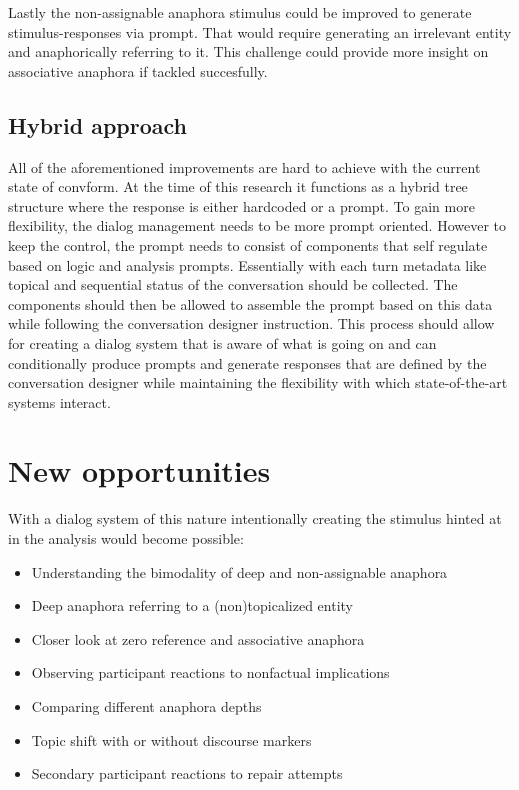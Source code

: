 \documentclass[12pt]{report}
\begin{document}
{        Lastly the non-assignable anaphora stimulus could be improved to generate stimulus-responses via prompt.
        That would require generating an irrelevant entity and anaphorically referring to it.
        This challenge could provide more insight on associative anaphora if tackled succesfully.

    \subsection{Hybrid approach}

            All of the aforementioned improvements are hard to achieve with the current state of convform.
            At the time of this research it functions as a hybrid tree structure where the response is either
            hardcoded or a prompt.
            To gain more flexibility, the dialog management needs to be more prompt oriented.
            However to keep the control, the prompt needs to consist of components that self regulate based on
            logic and analysis prompts.
            Essentially with each turn metadata
            like topical and sequential status of the conversation should be collected.
            The components should then be allowed to assemble the prompt
            based on this data while following the conversation designer instruction.
            This process should allow for creating a dialog system that is aware of what is going on
            and can conditionally produce prompts and generate responses
            that are defined by the conversation designer
            while maintaining the flexibility with which state-of-the-art systems interact.

\section{New opportunities}

With a dialog system of this nature
intentionally creating the stimulus hinted at in the analysis would become possible:

    \begin{itemize}
    \item{Understanding the bimodality of deep and non-assignable anaphora}
    \item{Deep anaphora referring to a (non)topicalized entity}
    \item{Closer look at zero reference and associative anaphora}
    \item{Observing participant reactions to nonfactual implications}
    \item{Comparing different anaphora depths}
    \item{Topic shift with or without discourse markers}
    \item{Secondary participant reactions to repair attempts}
    \end{itemize}

}
\end{document}
